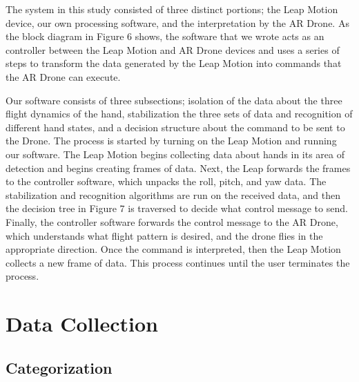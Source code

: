 \documentclass[letterpaper,english, 12pt]{article}
\begin{document}
The system in this study consisted of three distinct portions; the Leap Motion device, our own processing software, and the interpretation by the AR Drone. As the block diagram in Figure 6 shows, the software that we wrote acts as an controller between the Leap Motion and AR Drone devices and uses a series of steps to transform the data generated by the Leap Motion into commands that the AR Drone can execute.

Our software consists of three subsections; isolation of the data about the three flight dynamics of the hand, stabilization the three sets of data and recognition of different hand states, and a decision structure about the command to be sent to the Drone. The process is started by turning on the Leap Motion and running our software. The Leap Motion begins collecting data about hands in its area of detection and begins creating frames of data. Next, the Leap forwards the frames to the controller software, which unpacks the roll, pitch, and yaw data. The stabilization and recognition algorithms are run on the received data, and then the decision tree in Figure 7 is traversed to decide what control message to send. Finally, the controller software forwards the control message to the AR Drone, which understands what flight pattern is desired, and the drone flies in the appropriate direction. Once the command is interpreted, then the Leap Motion collects a new frame of data. This process continues until the user terminates the process.

\section*{Data Collection}
\subsection*{Categorization}
\end{document}
